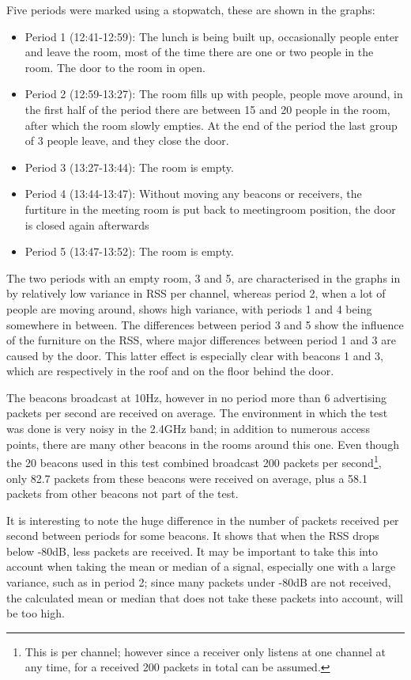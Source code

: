 Five periods were marked using a stopwatch, these are shown in the graphs:
\begin{itemize}
    \item Period 1 (12:41-12:59): The lunch is being built up, occasionally people enter and leave the room, most of the time there are one or two people in the room.
        The door to the room in open.
    \item Period 2 (12:59-13:27): The room fills up with people, people move around, in the first half of the period there are between 15 and 20 people in the room, after which the room slowly empties.
        At the end of the period the last group of 3 people leave, and they close the door.
    \item Period 3 (13:27-13:44): The room is empty.
    \item Period 4 (13:44-13:47): Without moving any beacons or receivers, the furtiture in the meeting room is put back to meetingroom position, the door is closed again afterwards
    \item Period 5 (13:47-13:52): The room is empty.
\end{itemize}

The two periods with an empty room, 3 and 5, are characterised in the graphs in  by relatively low variance in RSS per channel, whereas period 2, when a lot of people are moving around, shows high variance, with periods 1 and 4 being somewhere in between.
The differences between period 3 and 5 show the influence of the furniture on the RSS, where major differences between period 1 and 3 are caused by the door.
This latter effect is especially clear with beacons 1 and 3, which are respectively in the roof and on the floor behind the door.

The beacons broadcast at 10Hz, however in no period more than 6 advertising packets per second are received on average.
The environment in which the test was done is very noisy in the 2.4GHz band; in addition to numerous \wifi access points, there are many other beacons in the rooms around this one. 
Even though the 20 beacons used in this test combined broadcast 200 packets per second\footnote{This is per channel; however since a receiver only listens at one channel at any time, for a received 200 packets in total can be assumed.}, only 82.7 packets from these beacons were received on average, plus a 58.1 packets from other beacons not part of the test.

It is interesting to note the huge difference in the number of packets received per second between periods for some beacons.
It shows that when the RSS drops below -80dB, less packets are received.
It may be important to take this into account when taking the mean or median of a signal, especially one with a large variance, such as in period 2; since many packets under -80dB are not received, the calculated mean or median that does not take these packets into account, will be too high.

